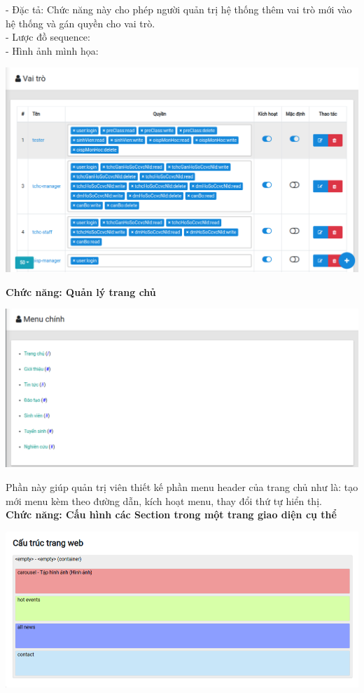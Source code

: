 - Đặc tả: Chức năng này cho phép người quản trị hệ thống thêm vai trò mới vào hệ thống và gán quyền cho vai trò.\\
- Lược đồ sequence:\\
- Hình ảnh mình họa:
\begin{center}
  \captionsetup{type=figure}
  \includegraphics[scale=0.6]{img/Screen/allrole.png}
\end{center}
\textbf{Chức năng: Quản lý trang chủ}
\begin{center}
  \captionsetup{type=figure}
  \includegraphics[scale=0.6]{img/Screen/menu.png}
\end{center}

Phần này giúp quản trị viên thiết kế phần menu header của trang chủ như là: tạo mới menu kèm theo đường dẫn, kích hoạt menu, thay đổi thứ tự hiển thị.\\

\textbf{Chức năng: Cấu hình các Section trong một trang giao diện cụ thể}
\begin{center}
  \captionsetup{type=figure}
  \includegraphics[scale=0.6]{img/Screen/section.png}
\end{center}

